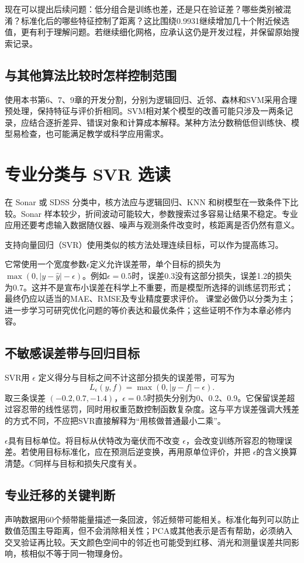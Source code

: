 现在可以提出后续问题：低分组合是训练也差，还是只在验证差？哪些类别被混淆？标准化后的哪些特征控制了距离？这比围绕0.9931继续增加几十个附近候选值，更有利于理解问题。若继续细化网格，应承认这仍是开发过程，并保留原始搜索记录。

\subsection{与其他算法比较时怎样控制范围}
使用本书第6、7、9章的开发分割，分别为逻辑回归、近邻、森林和SVM采用合理预处理，保持特征与评价折相同。SVM相对某个模型的改善可能只涉及一两条记录，应结合逐折差异、错误对象和计算成本解释。某种方法分数稍低但训练快、模型易检查，也可能满足教学或科学应用需求。

\section{专业分类与 SVR 选读}
在 Sonar 或 SDSS 分类中，核方法应与逻辑回归、KNN 和树模型在一致条件下比较。Sonar 样本较少，折间波动可能较大，参数搜索过多容易让结果不稳定。专业应用还要考虑输入数据随仪器、噪声与观测条件改变时，核距离是否仍然有意义。

支持向量回归（SVR）使用类似的核方法处理连续目标，可以作为提高练习。

它常使用一个宽度参数$\epsilon$定义允许误差带，单个目标的损失为 $\max(0,|y-\hat y|-\epsilon)$。例如$\epsilon=0.5$时，误差0.3没有这部分损失，误差1.2的损失为0.7。这并不是宣布小误差在科学上不重要，而是模型所选择的训练惩罚形式；最终仍应以适当的MAE、RMSE及专业精度要求评价。
课堂必做仍以分类为主；进一步学习可研究优化问题的等价表达和最优条件；这些证明不作为本章必修内容。

\subsection{不敏感误差带与回归目标}
SVR用 $\epsilon$ 定义得分与目标之间不计这部分损失的误差带，可写为
\[
L_\epsilon(y,f)=\max(0,|y-f|-\epsilon).
\]
取三条误差 $(-0.2,0.7,-1.4)$，$\epsilon=0.5$时损失分别为0、0.2、0.9。它保留误差超过容忍带的线性惩罚，同时用权重范数控制函数复杂度。这与平方误差强调大残差的方式不同，不应把SVR直接解释为“用核做普通最小二乘”。

$\epsilon$具有目标单位。将目标从伏特改为毫伏而不改变 $\epsilon$，会改变训练所容忍的物理误差。若使用目标标准化，应在预测后逆变换，再用原单位评价，并把 $\epsilon$的含义换算清楚。$C$同样与目标和损失尺度有关。

\subsection{专业迁移的关键判断}
声呐数据用60个频带能量描述一条回波，邻近频带可能相关。标准化每列可以防止数值范围主导距离，但不会消除相关性；PCA或其他表示是否有帮助，必须纳入交叉验证再比较。天文颜色空间中的邻近也可能受到红移、消光和测量误差共同影响，核相似不等于同一物理身份。

